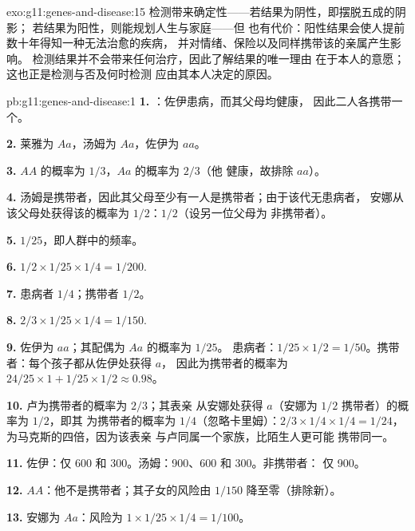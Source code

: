 \begin{solution}{exo:g11:genes-and-disease:15}
检测带来确定性——若结果为阴性，即摆脱五成的阴影；
若结果为阳性，则能规划人生与家庭——但
也有代价：阳性结果会使人提前数十年得知一种无法治愈的疾病，
并对情绪、保险以及同样携带该的亲属产生影响。
检测结果并不会带来任何治疗，因此了解结果的唯一理由
在于本人的意愿；这也正是检测与否及何时检测
应由其本人决定的原因。
\end{solution}

\begin{solution}{pb:g11:genes-and-disease:1}
\textbf{1.} ：佐伊患病，而其父母均健康，
因此二人各携带一个。

\textbf{2.} 莱雅为 $Aa$，汤姆为 $Aa$，佐伊为 $aa$。

\textbf{3.} $AA$ 的概率为 $1/3$，$Aa$ 的概率为 $2/3$（他
健康，故排除 $aa$）。

\textbf{4.} 汤姆是携带者，因此其父母至少有一人是携带者；由于该代无患病者，
安娜从该父母处获得该的概率为
$1/2$：$1/2$（设另一位父母为
非携带者）。

\textbf{5.} $1/25$，即人群中的频率。

\textbf{6.} $1/2 \times 1/25 \times 1/4 = 1/200$.

\textbf{7.} 患病者 $1/4$；携带者 $1/2$。

\textbf{8.} $2/3 \times 1/25 \times 1/4 = 1/150$.

\textbf{9.} 佐伊为 $aa$；其配偶为 $Aa$ 的概率为 $1/25$。
患病者：$1/25 \times 1/2 = 1/50$。携带者：每个孩子都从佐伊处获得 $a$，
因此为携带者的概率为 $24/25 \times 1 + 1/25 \times
1/2 \approx 0.98$。

\textbf{10.} 卢为携带者的概率为 $2/3$；其表亲
从安娜处获得 $a$（安娜为 $1/2$ 携带者）的概率为 $1/2$，即其
为携带者的概率为 $1/4$（忽略卡里姆）：$2/3 \times 1/4
\times 1/4 = 1/24$，为马克斯的四倍，因为该表亲
与卢同属一个家族，比陌生人更可能
携带同一。

\textbf{11.} 佐伊：仅 600 和 300。汤姆：900、600 和 300。非携带者：
仅 900。

\textbf{12.} $AA$：他不是携带者；其子女的风险由
$1/150$ 降至零（排除新）。

\textbf{13.} 安娜为 $Aa$：风险为 $1 \times 1/25 \times 1/4 = 1/100$。


\end{solution}
